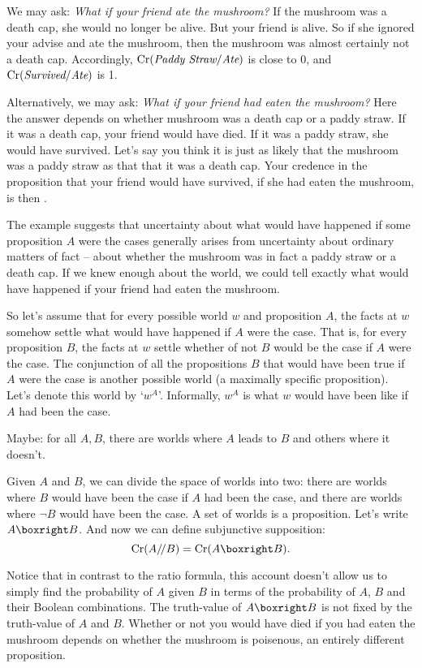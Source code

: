 {We may ask: \emph{What if your friend ate the mushroom?} If the
mushroom was a death cap, she would no longer be alive. But your
friend is alive. So if she ignored your advise and ate the mushroom,
then the mushroom was almost certainly not a death cap. Accordingly,
$\text{Cr}(\emph{Paddy Straw}/\emph{Ate})$ is close to 0, and
$\text{Cr}(\emph{Survived}/\emph{Ate})$ is 1.

Alternatively, we may ask: \emph{What if your friend had eaten the
  mushroom?} Here the answer depends on whether mushroom was a death
cap or a paddy straw. If it was a death cap, your friend would have
died. If it was a paddy straw, she would have survived. Let's say you
think it is just as likely that the mushroom was a paddy straw as that
that it was a death cap. Your credence in the proposition that your
friend would have survived, if she had eaten the mushroom, is then
.

The example suggests that uncertainty about what would have happened
if some proposition $A$ were the cases generally arises from
uncertainty about ordinary matters of fact -- about whether the
mushroom was in fact a paddy straw or a death cap. If we knew enough
about the world, we could tell exactly what would have happened if
your friend had eaten the mushroom.

So let's assume that for every possible world $w$ and proposition $A$,
the facts at $w$ somehow settle what would have happened if $A$ were
the case. That is, for every proposition $B$, the facts at $w$ settle
whether of not $B$ would be the case if $A$ were the case. The
conjunction of all the propositions $B$ that would have been true if
$A$ were the case is another possible world (a maximally specific
proposition). Let's denote this world by `$w^A$'. Informally, $w^A$ is
what $w$ would have been like if $A$ had been the case. 

Maybe: for all $A,B$, there are worlds where $A$ leads to $B$ and
others where it doesn't.

Given $A$ and $B$, we can divide the space of worlds into two: there
are worlds where $B$ would have been the case if $A$ had been the
case, and there are worlds where $\neg B$ would have been the case. A
set of worlds is a proposition. Let's write $A \boxright B$. And now
we can define subjunctive supposition:
\[
  \Cr(A/\!/B) = \Cr(A \boxright B).
\]

Notice that in contrast to the ratio formula, this account doesn't
allow us to simply find the probability of $A$ given $B$ in terms of
the probability of $A$, $B$ and their Boolean combinations. The
truth-value of $A \boxright B$ is not fixed by the truth-value of $A$
and $B$. Whether or not you would have died if you had eaten the
mushroom depends on whether the mushroom is poisenous, an entirely
different proposition. 

}
